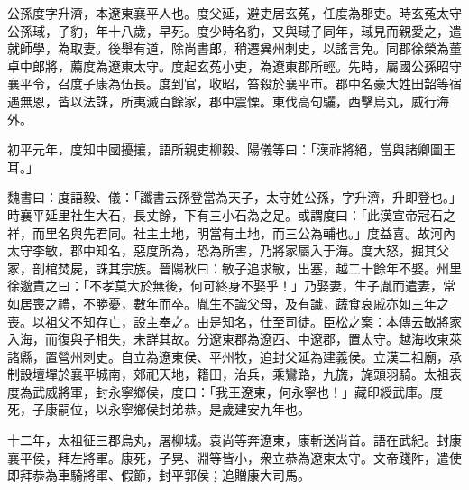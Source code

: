 
\begin{pinyinscope}
公孫度字升濟，本遼東襄平人也。度父延，避吏居玄菟，任度為郡吏。時玄菟太守公孫琙，子豹，年十八歲，早死。度少時名豹，又與琙子同年，琙見而親愛之，遣就師學，為取妻。後舉有道，除尚書郎，稍遷兾州刺史，以謠言免。同郡徐榮為董卓中郎將，薦度為遼東太守。度起玄菟小吏，為遼東郡所輕。先時，屬國公孫昭守襄平令，召度子康為伍長。度到官，收昭，笞殺於襄平市。郡中名豪大姓田韶等宿遇無恩，皆以法誅，所夷滅百餘家，郡中震慄。東伐高句驪，西擊烏丸，威行海外。

初平元年，度知中國擾攘，語所親吏柳毅、陽儀等曰：「漢祚將絕，當與諸卿圖王耳。」

魏書曰：度語毅、儀：「讖書云孫登當為天子，太守姓公孫，字升濟，升即登也。」時襄平延里社生大石，長丈餘，下有三小石為之足。或謂度曰：「此漢宣帝冠石之祥，而里名與先君同。社主土地，明當有土地，而三公為輔也。」度益喜。故河內太守李敏，郡中知名，惡度所為，恐為所害，乃將家屬入于海。度大怒，掘其父冢，剖棺焚屍，誅其宗族。晉陽秋曰：敏子追求敏，出塞，越二十餘年不娶。州里徐邈責之曰：「不孝莫大於無後，何可終身不娶乎！」乃娶妻，生子胤而遣妻，常如居喪之禮，不勝憂，數年而卒。胤生不識父母，及有識，蔬食哀戚亦如三年之喪。以祖父不知存亡，設主奉之。由是知名，仕至司徒。臣松之案：本傳云敏將家入海，而復與子相失，未詳其故。分遼東郡為遼西、中遼郡，置太守。越海收東萊諸縣，置營州刺史。自立為遼東侯、平州牧，追封父延為建義侯。立漢二祖廟，承制設壇墠於襄平城南，郊祀天地，籍田，治兵，乘鸞路，九旒，旄頭羽騎。太祖表度為武威將軍，封永寧鄉侯，度曰：「我王遼東，何永寧也！」藏印綬武庫。度死，子康嗣位，以永寧鄉侯封弟恭。是歲建安九年也。

十二年，太祖征三郡烏丸，屠柳城。袁尚等奔遼東，康斬送尚首。語在武紀。封康襄平侯，拜左將軍。康死，子晃、淵等皆小，衆立恭為遼東太守。文帝踐阼，遣使即拜恭為車騎將軍、假節，封平郭侯；追贈康大司馬。


\end{pinyinscope}
